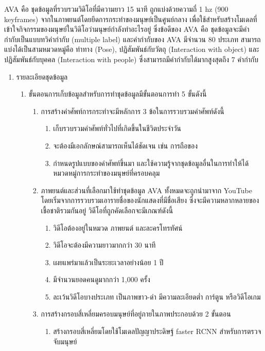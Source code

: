 AVA\textsuperscript{\cite{ava}} คือ ชุดข้อมูลที่รวบรวมวิดิโอที่มีความยาว 15 นาที ถูกแบ่งด้วยความถี่ 1 hz (900 keyframes) จากในภาพยนต์โดยยึดการกระทำของมนุษย์เป็นศูนย์กลาง
เพื่อใช้สำหรับสร้างโมเดลที่เข้าใจกิจกรรมของมนุษย์ในวิดิโอว่ามนุษย์กำลังทำอะไรอยู่ ซึ่งข้อดีของ AVA คือ ชุดข้อมูลจะมีคำกำกับเป็นแบบทวิคำกำกับ (multiple label)
และคำกำกับของ AVA มีจำนวน 80 ประเภท สามารถแบ่งได้เป็นสามหมวดหมู่คือ ท่าทาง (Pose), ปฏิสัมพันธ์กับวัตถุ (Interaction with object) 
และปฏิสัมพันธ์กับบุคคล (Interaction with people) ซึ่งสามารถมีคำกำกับได้มากสูงสุดถึง 7 คำกำกับ
\begin{enumerate}
	\item {รายละเอียดชุดข้อมูล}
	\begin{enumerate}
		\item ขั้นตอนการเก็บข้อมูลสำหรับการทำชุดข้อมูลมีขั้นตอนการทำ 5 ขั้นดังนี้
		\begin{enumerate}
			\item การสร้างคำศัพท์การกระทำจะมีหลักการ 3 ข้อในการรวบรวมคำศัพท์ดังนี้
			\begin{enumerate}
				\item เก็บรวบรวมคำศัพท์ทั่วไปที่เกิดขึ้นในชีวิตประจำวัน
				\item จะต้องมีเอกลักษณ์สามารถเห็นได้ชัดเจน เช่น การถือของ
				\item กำหนดรูปแบบของคำศัพท์ขึ้นมา และใช้ความรู้จากชุดข้อมูลอื่นในการทำให้ได้หมวดหมู่การกระทำของมนุษย์ที่ครอบคลุม
			\end{enumerate}
			\item ภาพยนต์และส่วนที่เลือกมาใช้ทำชุดข้อมูล AVA ทั้งหมดจะถูกนำมาจาก YouTube โดยเริ่มจากการรวบรวมเอารายชื่อของนักแสดงที่มีชื่อเสียง
			ซึ่งจะมีความหลากหลายของเชื้อชาติรวมกันอยู่ วิดีโอที่ถูกคัดเลือกจะมีเกณฑ์ดังนี้
			\begin{enumerate}
				\item วิดีโอต้องอยู่ในหมวด ภาพยนต์ และละครโทรทัศน์
				\item วิดีโอจะต้องมีความยาวมากกว่า 30 นาที
				\item เผยแพร่มาแล้วเป็นระยะเวลาอย่างน้อย 1 ปี
				\item มีจำนวนยอดคนดูมากกว่า 1,000 ครั้ง
				\item ละเว้นวิดีโอบางประเภท เป็นภาพขาว-ดำ มีความละเอียดต่ำ การ์ตูน หรือวิดีโอเกม
			\end{enumerate}
			\item การสร้างกรอบสี่เหลี่ยมครอบมนุษย์ที่อยู่ภายในภาพประกอบด้วย 2 ขั้นตอน
			\begin{enumerate}
				\item สร้างกรอบสี่เหลี่ยมโดยใช้โมเดลปัญญาประดิษฐ์ faster RCNN สำหรับการตรวจจับมนุษย์

\end{enumerate}
\end{enumerate}
\end{enumerate}
\end{enumerate}
